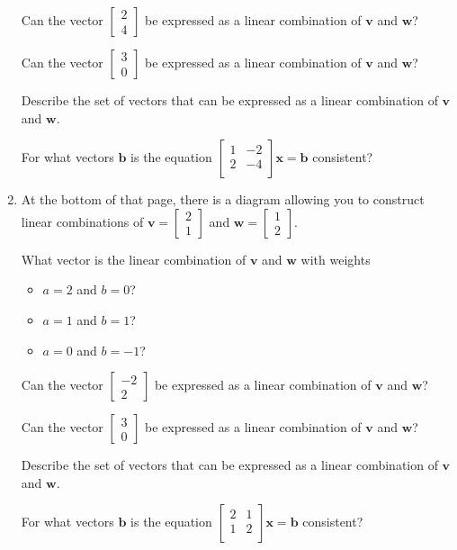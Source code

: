 \documentclass[12pt]{article}
\newcommand{\vs}[1]{\vspace{#1in}}
\newcommand{\bvec}{{\mathbf b}}
\newcommand{\vvec}{{\mathbf v}}
\newcommand{\wvec}{{\mathbf w}}
\newcommand{\xvec}{{\mathbf x}}
\newcommand{\twovec}[2]{\left[\begin{array}{r}#1 \\ #2
    \end{array}\right]}
\begin{document}
\begin{enumerate}
\begin{itemize}
    \vs{0.25}
  \end{itemize}

  Can the vector $\twovec24$ be expressed as a linear combination of
  $\vvec$ and $\wvec$?

  \vs{1}
  Can the vector $\twovec30$ be expressed as a linear combination of
  $\vvec$ and $\wvec$?

  \vs{1}
  \newpage
  Describe the set of vectors that can be expressed as a linear
  combination of $\vvec$ and $\wvec$.

  \vs{1}
  For what vectors $\bvec$ is the equation
  $
  \left[
    \begin{array}{cc}
      1 & -2 \\
      2 & -4 \\
    \end{array}
  \right]
  \xvec = \bvec
  $
  consistent?

  \vs{1}

\item At the bottom of that page, there is a diagram allowing you to
  construct linear combinations of
  $\vvec=\twovec21$ and $\wvec=\twovec12$.

  \medskip
  What vector is the linear combination of $\vvec$ and $\wvec$ with
  weights

  \begin{itemize}
  \item $a=2$ and $b=0$?

    \vs{0.25}
  \item $a=1$ and $b=1$?

    \vs{0.25}
  \item $a=0$ and $b=-1$?

    \vs{0.25}
  \end{itemize}

  Can the vector $\twovec{-2}2$ be expressed as a linear combination of
  $\vvec$ and $\wvec$?

  \vs{1}
  Can the vector $\twovec30$ be expressed as a linear combination of
  $\vvec$ and $\wvec$?

  \vs{1}
  \newpage
  Describe the set of vectors that can be expressed as a linear
  combination of $\vvec$ and $\wvec$.

  \vs{1}
  For what vectors $\bvec$ is the equation
  $
  \left[
    \begin{array}{cc}
      2 & 1 \\
      1 & 2 \\
    \end{array}
  \right]
  \xvec = \bvec
  $
  consistent?

  \vs{1}

  


                                          


  

\end{enumerate}
\end{document}
